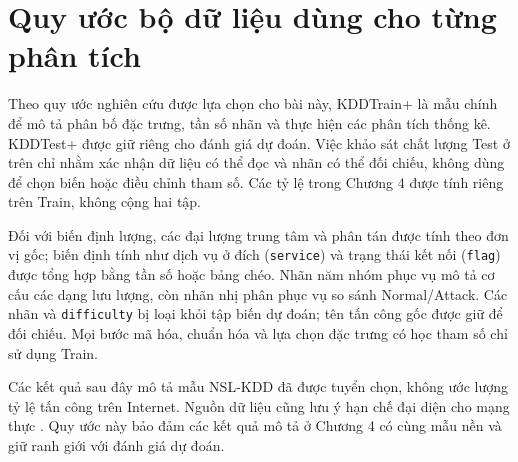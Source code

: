 \section{Quy ước bộ dữ liệu dùng cho từng phân tích}
Theo quy ước nghiên cứu được lựa chọn cho bài này, KDDTrain+ là mẫu chính để mô tả phân bố đặc trưng, tần số nhãn và thực hiện các phân tích thống kê. KDDTest+ được giữ riêng cho đánh giá dự đoán. Việc khảo sát chất lượng Test ở trên chỉ nhằm xác nhận dữ liệu có thể đọc và nhãn có thể đối chiếu, không dùng để chọn biến hoặc điều chỉnh tham số. Các tỷ lệ trong Chương 4 được tính riêng trên Train, không cộng hai tập.

Đối với biến định lượng, các đại lượng trung tâm và phân tán được tính theo đơn vị gốc; biến định tính như dịch vụ ở đích (\texttt{service}) và trạng thái kết nối (\texttt{flag}) được tổng hợp bằng tần số hoặc bảng chéo. Nhãn năm nhóm phục vụ mô tả cơ cấu các dạng lưu lượng, còn nhãn nhị phân phục vụ so sánh Normal/Attack. Các nhãn và \texttt{difficulty} bị loại khỏi tập biến dự đoán; tên tấn công gốc được giữ để đối chiếu. Mọi bước mã hóa, chuẩn hóa và lựa chọn đặc trưng có học tham số chỉ sử dụng Train.

Các kết quả sau đây mô tả mẫu NSL-KDD đã được tuyển chọn, không ước lượng tỷ lệ tấn công trên Internet. Nguồn dữ liệu cũng lưu ý hạn chế đại diện cho mạng thực \cite{task2_unb2009}. Quy ước này bảo đảm các kết quả mô tả ở Chương 4 có cùng mẫu nền và giữ ranh giới với đánh giá dự đoán.
\FloatBarrier

